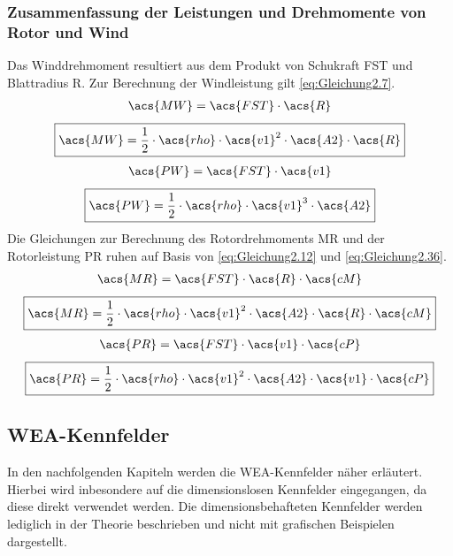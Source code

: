 \subsubsection{Zusammenfassung der Leistungen und Drehmomente von Rotor und Wind}
Das Winddrehmoment resultiert aus dem Produkt von Schukraft \acs{FST} und Blattradius \acs{R}. Zur Berechnung der Windleistung  gilt \autoref{eq:Gleichung2.7}.
\begin{align*}
    \acs{MW} = \acs{FST} \cdot \acs{R}
\end{align*}
\begin{equation}\label{eq:Gleichung2.37}
    \boxed{\acs{MW} = \frac{1}{2} \cdot \acs{rho} \cdot \acs{v1}^2 \cdot \acs{A2} \cdot \acs{R}}
\end{equation}
\newline
\begin{align*}
    \acs{PW} = \acs{FST} \cdot \acs{v1}
\end{align*}
\begin{equation}\label{eq:Gleichung2.38}
    \boxed{\acs{PW} = \frac{1}{2} \cdot \acs{rho} \cdot \acs{v1}^3 \cdot \acs{A2}}
\end{equation}
\newline
Die Gleichungen zur Berechnung des Rotordrehmoments \acs{MR} und der Rotorleistung \acs{PR} ruhen auf Basis von \autoref{eq:Gleichung2.12} und \autoref{eq:Gleichung2.36}.
\begin{align*}
    \acs{MR} = \acs{FST} \cdot \acs{R} \cdot \acs{cM}
\end{align*}
\begin{equation}\label{eq:Gleichung2.39}
    \boxed{\acs{MR} = \frac{1}{2} \cdot \acs{rho} \cdot \acs{v1}^2 \cdot \acs{A2} \cdot \acs{R} \cdot \acs{cM}}
\end{equation}
\newline
\begin{align*}
    \acs{PR} = \acs{FST} \cdot \acs{v1} \cdot \acs{cP}
\end{align*}
\begin{equation}\label{eq:Gleichung2.40}
    \boxed{\acs{PR} = \frac{1}{2} \cdot \acs{rho} \cdot \acs{v1}^2 \cdot \acs{A2} \cdot \acs{v1} \cdot \acs{cP}}
\end{equation}

\subsection{WEA-Kennfelder} \label{kennfelder}
In den nachfolgenden Kapiteln werden die WEA-Kennfelder näher erläutert. Hierbei wird inbesondere auf die dimensionslosen Kennfelder eingegangen, da diese direkt verwendet werden. Die dimensionsbehafteten Kennfelder werden lediglich in der Theorie beschrieben und nicht mit grafischen Beispielen dargestellt.

